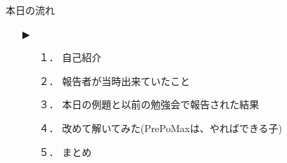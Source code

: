 \begin{frame}{本日の流れ}
  \begin{itemize}
     \item[▶] 
     \begin{itemize}[itemsep=1.3ex, leftmargin=1cm]
       \item[１．] 自己紹介
       \item[２．] 報告者が当時出来ていたこと
       \item[３．] 本日の例題と以前の勉強会で報告された結果
       \item[４．] 改めて解いてみた(PrePoMaxは、やればできる子)
       \item[５．] まとめ
    \end{itemize}
  \end{itemize}
\end{frame}

